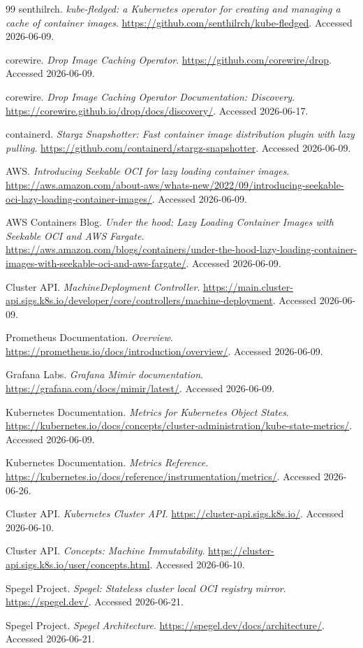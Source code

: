 \documentclass[11pt,a4paper]{article}
\begin{document}
\begin{thebibliography}{99}
senthilrch. \emph{kube-fledged: a Kubernetes operator for creating and managing a cache of container images}. \url{https://github.com/senthilrch/kube-fledged}. Accessed 2026-06-09.

corewire. \emph{Drop Image Caching Operator}. \url{https://github.com/corewire/drop}. Accessed 2026-06-09.

corewire. \emph{Drop Image Caching Operator Documentation: Discovery}. \url{https://corewire.github.io/drop/docs/discovery/}. Accessed 2026-06-17.

containerd. \emph{Stargz Snapshotter: Fast container image distribution plugin with lazy pulling}. \url{https://github.com/containerd/stargz-snapshotter}. Accessed 2026-06-09.

AWS. \emph{Introducing Seekable OCI for lazy loading container images}. \url{https://aws.amazon.com/about-aws/whats-new/2022/09/introducing-seekable-oci-lazy-loading-container-images/}. Accessed 2026-06-09.

AWS Containers Blog. \emph{Under the hood: Lazy Loading Container Images with Seekable OCI and AWS Fargate}. \url{https://aws.amazon.com/blogs/containers/under-the-hood-lazy-loading-container-images-with-seekable-oci-and-aws-fargate/}. Accessed 2026-06-09.


Cluster API. \emph{MachineDeployment Controller}. \url{https://main.cluster-api.sigs.k8s.io/developer/core/controllers/machine-deployment}. Accessed 2026-06-09.

Prometheus Documentation. \emph{Overview}. \url{https://prometheus.io/docs/introduction/overview/}. Accessed 2026-06-09.

Grafana Labs. \emph{Grafana Mimir documentation}. \url{https://grafana.com/docs/mimir/latest/}. Accessed 2026-06-09.

Kubernetes Documentation. \emph{Metrics for Kubernetes Object States}. \url{https://kubernetes.io/docs/concepts/cluster-administration/kube-state-metrics/}. Accessed 2026-06-09.

Kubernetes Documentation. \emph{Metrics Reference}. \url{https://kubernetes.io/docs/reference/instrumentation/metrics/}. Accessed 2026-06-26.


Cluster API. \emph{Kubernetes Cluster API}. \url{https://cluster-api.sigs.k8s.io/}. Accessed 2026-06-10.

Cluster API. \emph{Concepts: Machine Immutability}. \url{https://cluster-api.sigs.k8s.io/user/concepts.html}. Accessed 2026-06-10.


Spegel Project. \emph{Spegel: Stateless cluster local OCI registry mirror}. \url{https://spegel.dev/}. Accessed 2026-06-21.

Spegel Project. \emph{Spegel Architecture}. \url{https://spegel.dev/docs/architecture/}. Accessed 2026-06-21.

\end{thebibliography}
\end{document}
